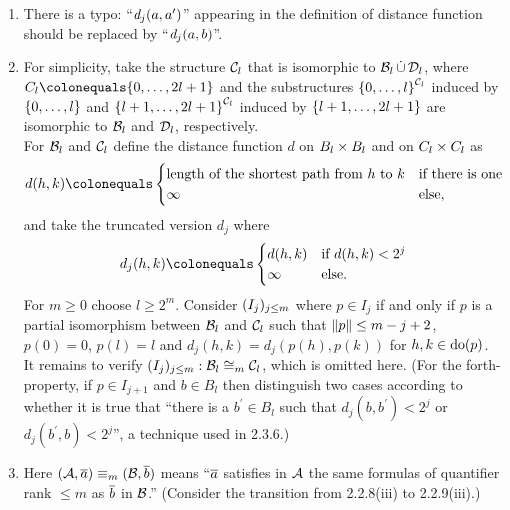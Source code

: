 \begin{enumerate}[1.]
%
\item {} There is a typo: ``$\dist[j]{a}{a^\prime}$'' appearing in the definition of distance function should be replaced by ``$\dist[j]{a}{b}$''.
%
\item {} For simplicity, take the structure $\mathcal{C}_l$ that is isomorphic to $\mathcal{B}_l \mathop{\dot{\cup}} \mathcal{D}_l$, where $C_l \defas \sete{0, \ldots, 2l + 1}$ and the substructures ${\{0, \ldots, l\}}^{\mathcal{C}_l}$ induced by ${\{0, \ldots, l\}}$ and ${\{l + 1, \ldots, 2l + 1\}}^{\mathcal{C}_l}$ induced by ${\{l + 1, \ldots, 2l + 1\}}$ are isomorphic to $\mathcal{B}_l$ and $\mathcal{D}_l$, respectively.
\medskip\\
For $\mathcal{B}_l$ and $\mathcal{C}_l$ define the distance function $d$ on $B_l \times B_l$ and on $C_l \times C_l$ as
\[
d(h, k) \defas
\begin{cases}
\mbox{length of the shortest path from \begin{math}h\end{math} to \begin{math}k\end{math}} & \mbox{if there is one} \cr
\infty & \mbox{else},
\end{cases}
\]
and take the truncated version $d_j$ where
\[
d_j(h, k) \defas
\begin{cases}
d(h, k) & \mbox{if \begin{math}d(h, k) < 2^j\end{math}} \cr
\infty & \mbox{else}.
\end{cases}
\]
For $m \geq 0$ choose $l \geq 2^m$. Consider $(I_j)_{j \leq m}$ where $p \in I_j$ if and only if $p$ is a partial isomorphism between $\mathcal{B}_l$ and $\mathcal{C}_l$ such that $\|p\| \leq m - j + 2$, $p(0) = 0$, $p(l) = l$ and $d_j(h, k) = d_j(p(h), p(k))$ for $h, k \in {\mathrm{do}({p})}$.
\medskip\\
It remains to verify $\seqi{I_j}{j \leq m} : \strct{B}_l \isom[m] \strct{C}_l$, which is omitted here. (For the forth-property, if $p \in I_{j + 1}$ and $b \in B_l$ then distinguish two cases according to whether it is true that ``there is a $b^\prime \in B_l$ such that $d_j(b, b^\prime) < 2^j$ or $d_j(b^\prime, b) < 2^j$'', a technique used in 2.3.6.)
%
\item {} Here $(\strct{A}, \vect{a}) \equv[m] (\strct{B}, \vect{b})$ means ``$\overline{a}$ satisfies in $\mathcal{A}$ the same formulas of quantifier rank $\leq m$ as $\overline{b}$ in $\mathcal{B}$.'' (Consider the transition from 2.2.8(iii) to 2.2.9(iii).)

\end{enumerate}
